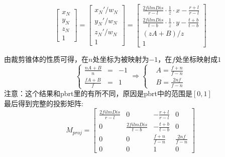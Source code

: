 \begin{displaymath}
\begin{bmatrix}
x_N\\
y_N\\
z_N\\
1
\end{bmatrix} = 
\begin{bmatrix}
x_N'/w_N\\
y_N'/w_N\\
z_N'/w_N\\
1
\end{bmatrix} = 
\begin{bmatrix}
\frac{2filmDis}{r - l}\cdot\frac{1}{z}\cdot x - \frac{r + l}{r - l}\\
\frac{2filmDis}{t - b}\cdot\frac{1}{z}\cdot y - \frac{t + b}{t - b}\\
(zA + B) / z \\
1
\end{bmatrix}
\end{displaymath}

由裁剪锥体的性质可得，在$n$处坐标为被映射为$-1$，在$f$处坐标映射成$1$
\begin{displaymath}
\left\{
\begin{aligned}{}
\frac{nA + B}{n} & = & -1\\
\frac{fA + B}{f} & = & 1
\end{aligned}
\right.
\Rightarrow
\left\{
\begin{aligned}
&A = \frac{f + n}{f - n}\\
&B = \frac{2nf}{f - n}
\end{aligned}
\right.
\end{displaymath}
注意：这个结果和pbrt里的有所不同，原因是pbrt中的范围是$[0,1]$
\\

最后得到完整的投影矩阵:
\begin{displaymath}
M_{proj} = 
\begin{bmatrix}
\frac{2filmDis}{r - l} & 0 & -\frac{r + l}{r - l} & 0\\
0 & \frac{2filmDis}{t - b} & -\frac{t + b}{t - b} & 0\\
0 & 0 & \frac{f + n}{f - n} & \frac{2nf}{f - n}\\
0 & 0 & 1 & 0
\end{bmatrix}
\end{displaymath}
\\

